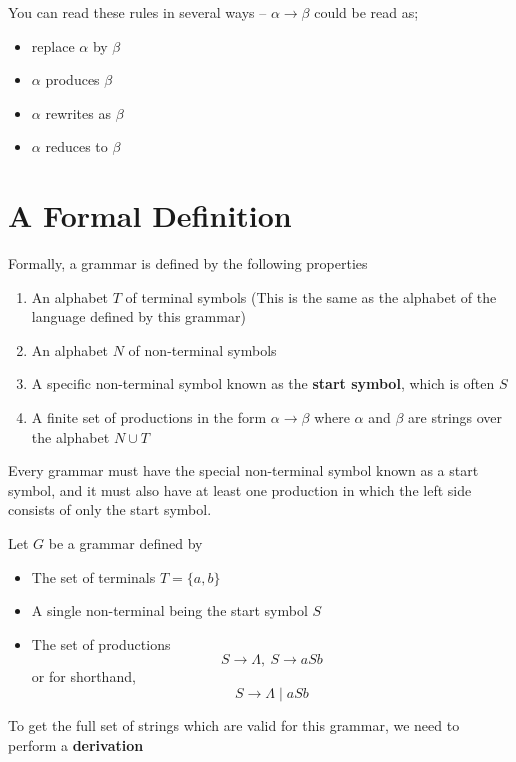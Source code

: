 You can read these rules in several ways -- $\alpha \rightarrow \beta$ could be read as;
\begin{itemize}
  \item replace $\alpha$ by $\beta$
  \item $\alpha$ produces $\beta$
  \item $\alpha$ rewrites as $\beta$
  \item $\alpha$ reduces to $\beta$
\end{itemize}

\section*{A Formal Definition}

Formally, a grammar is defined by the following properties
\begin{enumerate}
  \item An alphabet $T$ of terminal symbols (This is the same as the alphabet of the language defined by this grammar)
  \item An alphabet $N$ of non-terminal symbols
  \item A specific non-terminal symbol known as the \textbf{start symbol}, which is often $S$
  \item A finite set of productions in the form $\alpha \rightarrow \beta$ where $\alpha$ and $\beta$ are strings over
   the alphabet $N \cup T$
\end{enumerate}

Every grammar must have the special non-terminal symbol known as a start symbol, and it must also have at least one
 production in which the left side consists of only the start symbol.

\begin{example*}{}{}
  Let $G$ be a grammar defined by
  \begin{itemize}
    \item The set of terminals $T = \{a, b\}$
    \item A single non-terminal being the start symbol $S$
    \item The set of productions
    \begin{equation*}
      S \rightarrow \Lambda,\ S \rightarrow aSb
    \end{equation*}
     or for shorthand,
    \begin{equation*}
      S \rightarrow \Lambda \mid aSb
    \end{equation*}
  \end{itemize}
  To get the full set of strings which are valid for this grammar, we need to perform a \textbf{derivation}
\end{example*}

